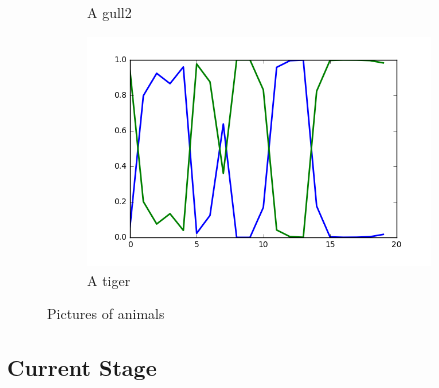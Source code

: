 \documentclass[12pt]{article}
\begin{document}
\begin{figure}[H]
\begin{subfigure}[b]{0.33\textwidth}
                \caption{A gull2}
                \label{fig:gull2}
        \end{subfigure}%
        \begin{subfigure}[b]{0.33\textwidth}
                \includegraphics[width=\linewidth]{var-init-10_var-prop-5_iter-500}
                \caption{A tiger}
                \label{fig:tiger}
        \end{subfigure}
        \caption{Pictures of animals}\label{fig:animals}
\end{figure}

\subsection*{Current Stage}

\end{document}
